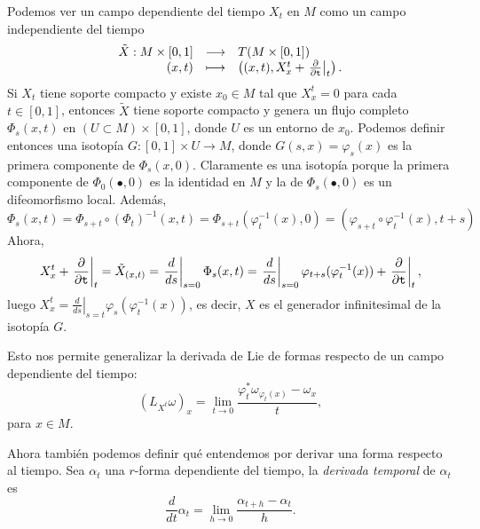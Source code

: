   Podemos ver un campo dependiente del tiempo $X_t$ en $M$ como un campo independiente del tiempo
  \begin{equation*}
    \begin{array}{rcl}
    \tilde{X}: M \times [0,1] & \longrightarrow & T(M \times [0,1]) \\
    (x,t) &\longmapsto& \left( (x,t),X^t_x+\left.\frac{\partial}{\partial \mathtt{t}}\right|_t \right).
  \end{array}
  \end{equation*}
  Si $X_t$ tiene soporte compacto y existe $x_0 \in M$ tal que $X^t_x=0$ para cada $t\in[0,1]$, entonces $\tilde{X}$ tiene soporte compacto y genera un flujo completo $\Phi_s(x,t)$ en $(U \subset M) \times [0,1]$, donde $U$ es un entorno de $x_0$. Podemos definir entonces una isotopía $G:[0,1]\times U \rightarrow M$, donde $G(s,x)=\varphi_s(x)$ es la primera componente de $\Phi_s(x,0)$. Claramente es una isotopía porque la primera componente de $\Phi_0(\bullet,0)$ es la identidad en $M$ y la de $\Phi_s(\bullet,0)$ es un difeomorfismo local. Además, 
  \begin{equation*}
    \Phi_s(x,t)=\Phi_{s+t}\circ(\Phi_t)^{-1}(x,t)=\Phi_{s+t}\left( \varphi_t^{-1}(x),0 \right)=(\varphi_{s+t}\circ\varphi_t^{-1}(x),t+s)
  \end{equation*}
  Ahora,
  \begin{equation*}
    X_x^t+\left.\frac{\partial}{\partial \mathtt{t}}\right|_t=\tilde{X}_{(x,t)}=\left.\frac{d}{ds}\right|_{s=0}\Phi_s(x,t)=\left.\frac{d}{ds}\right|_{s=0}\varphi_{t+s}(\varphi_t^{-1}(x))+\left.\frac{\partial}{\partial \mathtt{t}}\right|_t,
  \end{equation*}
  luego $X^t_x =\left.\frac{d}{ds}\right|_{s=t}\varphi_s(\varphi_t^{-1}(x))$, es decir, $X$ es el generador infinitesimal de la isotopía $G$.

  Esto nos permite generalizar la derivada de Lie de formas respecto de un campo dependiente del tiempo:
  \begin{equation*}
    (L_{X^t}\omega)_x=\lim_{t\rightarrow 0}\frac{\varphi^*_t \omega_{\varphi_t(x)} - \omega_x}{t},
  \end{equation*}
  para $x\in M$.
  
  Ahora también podemos definir qué entendemos por derivar una forma respecto al tiempo. Sea $\alpha_t$ una $r$-forma dependiente del tiempo, la \emph{derivada temporal} de $\alpha_t$ es
    \begin{equation*}
      \frac{d}{dt} \alpha_t = \lim_{h\rightarrow 0}\frac{\alpha_{t+h}-\alpha_t}{h}.
    \end{equation*}

